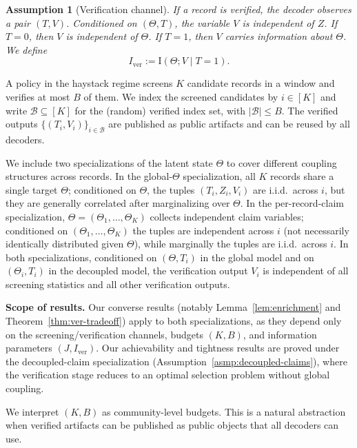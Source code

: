 \documentclass[twocolumn]{scholar7}
\newtheorem{assumption}[theorem]{Assumption}
\newcommand{\cB}{\mathcal{B}}
\newcommand{\I}{\mathrm{I}}
\newcommand{\abs}[1]{\left|#1\right|}
\newcommand{\bracks}[1]{\left[#1\right]}
\newcommand{\idx}[1]{\bracks{#1}} %
\begin{document}
\begin{assumption}[Verification channel]
\label{asmp:verification-channel}
If a record is verified, the decoder observes a pair $(T,V)$.
Conditioned on $(\Theta,T)$, the variable $V$ is independent of $Z$.
If $T=0$, then $V$ is independent of $\Theta$.
If $T=1$, then $V$ carries information about $\Theta$.
We define
\begin{equation}
  I_{\mathrm{ver}}:=\I(\Theta;V\mid T=1).
  \label{eq:iver}
\end{equation}
\end{assumption}

A policy in the haystack regime screens $K$ candidate records in a window and verifies at most $B$ of them.
We index the screened candidates by $i\in\idx{K}$ and write $\cB\subseteq\idx{K}$ for the (random) verified index set, with $\abs{\cB}\le B$.
The verified outputs $\{(T_i,V_i)\}_{i\in\cB}$ are published as public artifacts and can be reused by all decoders.

We include two specializations of the latent state $\Theta$ to cover different coupling structures across records.
In the global-$\Theta$ specialization, all $K$ records share a single target $\Theta$; conditioned on $\Theta$, the tuples $(T_i,Z_i,V_i)$ are i.i.d.\ across $i$, but they are generally correlated after marginalizing over $\Theta$.
In the per-record-claim specialization, $\Theta=(\Theta_1,\ldots,\Theta_K)$ collects independent claim variables; conditioned on $(\Theta_1,\ldots,\Theta_K)$ the tuples are independent across $i$ (not necessarily identically distributed given $\Theta$), while marginally the tuples are i.i.d.\ across $i$.
In both specializations, conditioned on $(\Theta,T_i)$ in the global model and on $(\Theta_i,T_i)$ in the decoupled model, the verification output $V_i$ is independent of all screening statistics and all other verification outputs.

\textbf{Scope of results.}
Our converse results (notably Lemma~\ref{lem:enrichment} and Theorem~\ref{thm:ver-tradeoff}) apply to both specializations, as they depend only on the screening/verification channels, budgets $(K,B)$, and information parameters $(J,I_{\mathrm{ver}})$.
Our achievability and tightness results are proved under the decoupled-claim specialization (Assumption~\ref{asmp:decoupled-claims}), where the verification stage reduces to an optimal selection problem without global coupling.




We interpret $(K,B)$ as community-level budgets.
This is a natural abstraction when verified artifacts can be published as public objects that all decoders can use.
\end{document}
